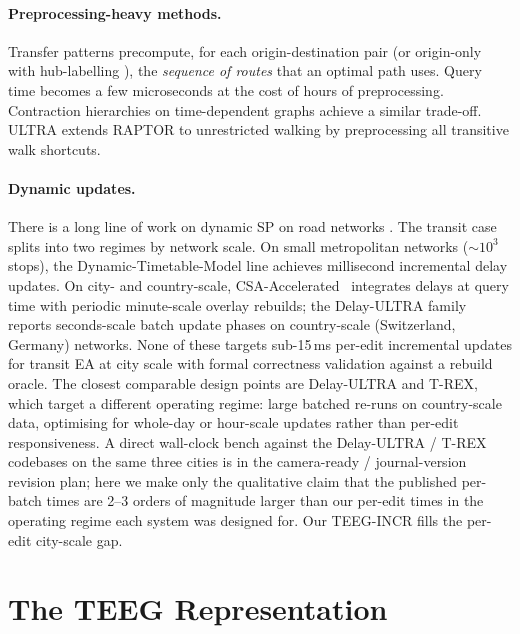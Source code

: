 \documentclass[letterpaper]{article}
\theoremstyle{definition}
\theoremstyle{plain}
\begin{document}
\paragraph{Preprocessing-heavy methods.}
Transfer patterns \cite{bast2010tp} precompute, for each origin-destination
pair (or origin-only with hub-labelling \cite{delling2014hublabel}), the
\emph{sequence of routes} that an optimal path uses. Query time becomes a few
microseconds at the cost of hours of preprocessing. Contraction hierarchies
on time-dependent graphs \cite{geisberger2008ch} achieve a similar trade-off.
ULTRA \cite{baum2019ultra} extends RAPTOR to unrestricted walking by
preprocessing all transitive walk shortcuts.

\paragraph{Dynamic updates.}
There is a long line of work on dynamic SP on road networks
\cite{geisberger2012dyna,delling2017customizable}. The transit case
splits into two regimes by network scale. On small metropolitan
networks ($\sim\!10^3$ stops), the Dynamic-Timetable-Model line
\cite{cionini2014dtm,giannakopoulou2019mdtm} achieves millisecond
incremental delay updates. On city- and country-scale,
CSA-Accelerated~\cite{strasser2014csaaccelerated} integrates delays
at query time with periodic minute-scale overlay rebuilds; the
Delay-ULTRA family~\cite{bez2024delayultra,sauer2026trex,katkalo2026delayultramem}
reports seconds-scale batch update phases on country-scale
(Switzerland, Germany) networks. None of these targets sub-15\,ms
per-edit incremental updates for transit EA at city scale with
formal correctness validation against a rebuild oracle. The
closest comparable design points are Delay-ULTRA and T-REX, which
target a different operating regime: large batched re-runs on
country-scale data, optimising for whole-day or hour-scale updates
rather than per-edit responsiveness. A direct wall-clock bench
against the Delay-ULTRA / T-REX codebases on the same three cities
is in the camera-ready / journal-version revision plan; here we
make only the qualitative claim that the published per-batch times
are 2--3 orders of magnitude larger than our per-edit times in the
operating regime each system was designed for. Our TEEG-INCR fills
the per-edit city-scale gap.

\section{The TEEG Representation}
\label{sec:teeg}
\end{document}
